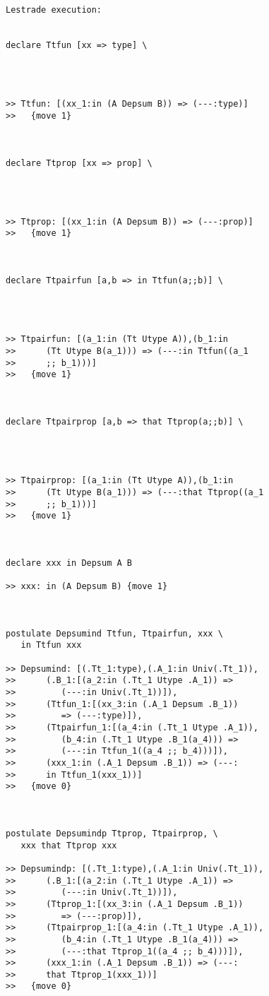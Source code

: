 \documentclass{article}
\begin{document}
\begin{verbatim}Lestrade execution:


declare Ttfun [xx => type] \
   



>> Ttfun: [(xx_1:in (A Depsum B)) => (---:type)]
>>   {move 1}



declare Ttprop [xx => prop] \
   



>> Ttprop: [(xx_1:in (A Depsum B)) => (---:prop)]
>>   {move 1}



declare Ttpairfun [a,b => in Ttfun(a;;b)] \
   



>> Ttpairfun: [(a_1:in (Tt Utype A)),(b_1:in
>>      (Tt Utype B(a_1))) => (---:in Ttfun((a_1
>>      ;; b_1)))]
>>   {move 1}



declare Ttpairprop [a,b => that Ttprop(a;;b)] \
   



>> Ttpairprop: [(a_1:in (Tt Utype A)),(b_1:in
>>      (Tt Utype B(a_1))) => (---:that Ttprop((a_1
>>      ;; b_1)))]
>>   {move 1}



declare xxx in Depsum A B

>> xxx: in (A Depsum B) {move 1}



postulate Depsumind Ttfun, Ttpairfun, xxx \
   in Ttfun xxx

>> Depsumind: [(.Tt_1:type),(.A_1:in Univ(.Tt_1)),
>>      (.B_1:[(a_2:in (.Tt_1 Utype .A_1)) =>
>>         (---:in Univ(.Tt_1))]),
>>      (Ttfun_1:[(xx_3:in (.A_1 Depsum .B_1))
>>         => (---:type)]),
>>      (Ttpairfun_1:[(a_4:in (.Tt_1 Utype .A_1)),
>>         (b_4:in (.Tt_1 Utype .B_1(a_4))) =>
>>         (---:in Ttfun_1((a_4 ;; b_4)))]),
>>      (xxx_1:in (.A_1 Depsum .B_1)) => (---:
>>      in Ttfun_1(xxx_1))]
>>   {move 0}



postulate Depsumindp Ttprop, Ttpairprop, \
   xxx that Ttprop xxx

>> Depsumindp: [(.Tt_1:type),(.A_1:in Univ(.Tt_1)),
>>      (.B_1:[(a_2:in (.Tt_1 Utype .A_1)) =>
>>         (---:in Univ(.Tt_1))]),
>>      (Ttprop_1:[(xx_3:in (.A_1 Depsum .B_1))
>>         => (---:prop)]),
>>      (Ttpairprop_1:[(a_4:in (.Tt_1 Utype .A_1)),
>>         (b_4:in (.Tt_1 Utype .B_1(a_4))) =>
>>         (---:that Ttprop_1((a_4 ;; b_4)))]),
>>      (xxx_1:in (.A_1 Depsum .B_1)) => (---:
>>      that Ttprop_1(xxx_1))]
>>   {move 0}


\end{verbatim}
\end{document}
